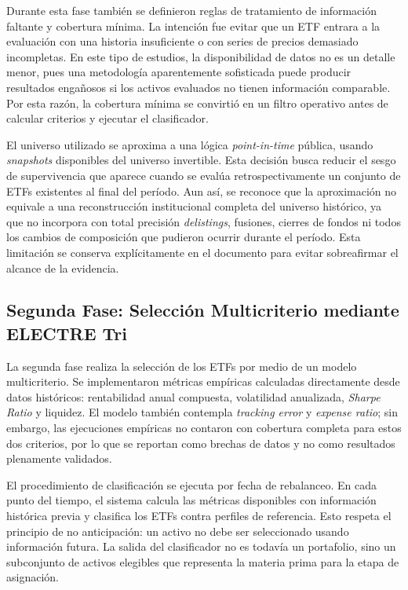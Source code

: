 \documentclass[12pt,letterpaper]{article}
\begin{document}
Durante esta fase también se definieron reglas de tratamiento de información faltante y cobertura mínima. La intención fue evitar que un ETF entrara a la evaluación con una historia insuficiente o con series de precios demasiado incompletas. En este tipo de estudios, la disponibilidad de datos no es un detalle menor, pues una metodología aparentemente sofisticada puede producir resultados engañosos si los activos evaluados no tienen información comparable. Por esta razón, la cobertura mínima se convirtió en un filtro operativo antes de calcular criterios y ejecutar el clasificador.

El universo utilizado se aproxima a una lógica \textit{point-in-time} pública, usando \textit{snapshots} disponibles del universo invertible. Esta decisión busca reducir el sesgo de supervivencia que aparece cuando se evalúa retrospectivamente un conjunto de ETFs existentes al final del período. Aun así, se reconoce que la aproximación no equivale a una reconstrucción institucional completa del universo histórico, ya que no incorpora con total precisión \textit{delistings}, fusiones, cierres de fondos ni todos los cambios de composición que pudieron ocurrir durante el período. Esta limitación se conserva explícitamente en el documento para evitar sobreafirmar el alcance de la evidencia.


\subsection{Segunda Fase: Selección Multicriterio mediante ELECTRE Tri}

La segunda fase realiza la selección de los ETFs por medio de un modelo multicriterio. Se implementaron métricas empíricas calculadas directamente desde datos históricos: rentabilidad anual compuesta, volatilidad anualizada, \textit{Sharpe Ratio} y liquidez. El modelo también contempla \textit{tracking error} y \textit{expense ratio}; sin embargo, las ejecuciones empíricas no contaron con cobertura completa para estos dos criterios, por lo que se reportan como brechas de datos y no como resultados plenamente validados.

El procedimiento de clasificación se ejecuta por fecha de rebalanceo. En cada punto del tiempo, el sistema calcula las métricas disponibles con información histórica previa y clasifica los ETFs contra perfiles de referencia. Esto respeta el principio de no anticipación: un activo no debe ser seleccionado usando información futura. La salida del clasificador no es todavía un portafolio, sino un subconjunto de activos elegibles que representa la materia prima para la etapa de asignación.
\end{document}
